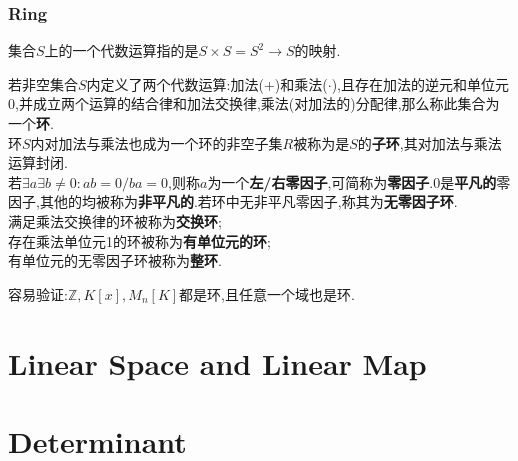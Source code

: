 \documentclass[UTF8,a4paper,notitlepage]{book}
\begin{document}
    \subsection{Ring}
    集合$S$上的一个代数运算指的是$S\times S=S^2\rightarrow S$的映射.
    \begin{definition}[环的基本概念]\mbox{}
        若非空集合$S$内定义了两个代数运算:加法(+)和乘法($\cdot$),且存在加法的逆元和单位元0,并成立两个运算的结合律和加法交换律,乘法(对加法的)分配律,那么称此集合为一个\textbf{环}.\\ 
        环$S$内对加法与乘法也成为一个环的非空子集$R$被称为是$S$的\textbf{子环},其对加法与乘法运算封闭.\\ 
        若$\exists a \exists b\neq 0:ab=0 / ba=0$,则称$a$为一个\textbf{左/右零因子},可简称为\textbf{零因子}.0是\textbf{平凡的}零因子,其他的均被称为\textbf{非平凡的}.若环中无非平凡零因子,称其为\textbf{无零因子环}.\\
        满足乘法交换律的环被称为\textbf{交换环};\\ 
        存在乘法单位元1的环被称为\textbf{有单位元的环};\\ 
        有单位元的无零因子环被称为\textbf{整环}.\\ 
    \end{definition}
    容易验证:$\mathbb{Z},K[x],M_n[K]$都是环,且任意一个域也是环.
    \chapter{Linear Space and Linear Map}
    \chapter{Determinant}
\end{document}
